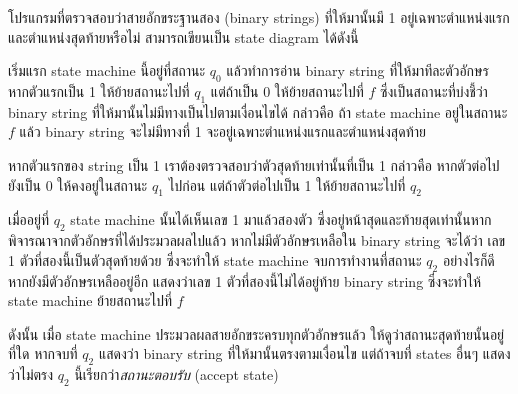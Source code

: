 \begin{example}
โปรแกรมที่ตรวจสอบว่าสายอักขระฐานสอง (binary strings) ที่ให้มานั้นมี 1 อยู่เฉพาะตำแหน่งแรกและตำแหน่งสุดท้ายหรือไม่ สามารถเขียนเป็น state diagram ได้ดังนี้
\begin{center}
\end{center}
เริ่มแรก state machine นี้อยู่ที่สถานะ $q_0$ แล้วทำการอ่าน binary string ที่ให้มาทีละตัวอักษร หากตัวแรกเป็น 1 ให้ย้ายสถานะไปที่ $q_1$ แต่ถ้าเป็น 0 ให้ย้ายสถานะไปที่ $f$ ซึ่งเป็นสถานะที่บ่งชี้ว่า binary string ที่ให้มานั้นไม่มีทางเป็นไปตามเงื่อนไขได้ กล่าวคือ ถ้า state machine อยู่ในสถานะ $f$ แล้ว binary string จะไม่มีทางที่ 1 จะอยู่เฉพาะตำแหน่งแรกและตำแหน่งสุดท้าย

หากตัวแรกของ string เป็น 1 เราต้องตรวจสอบว่าตัวสุดท้ายเท่านั้นที่เป็น 1 กล่าวคือ หากตัวต่อไปยังเป็น 0 ให้คงอยู่ในสถานะ $q_1$ ไปก่อน แต่ถ้าตัวต่อไปเป็น 1 ให้ย้ายสถานะไปที่ $q_2$

เมื่ออยู่ที่ $q_2$ state machine นั้นได้เห็นเลข 1 มาแล้วสองตัว ซึ่งอยู่หน้าสุดและท้ายสุดเท่านั้นหากพิจารณาจากตัวอักษรที่ได้ประมวลผลไปแล้ว \enskip หากไม่มีตัวอักษรเหลือใน binary string จะได้ว่า เลข 1 ตัวที่สองนี้เป็นตัวสุดท้ายด้วย ซึ่งจะทำให้ state machine จบการทำงานที่สถานะ $q_2$ อย่างไรก็ดี หากยังมีตัวอักษรเหลืออยู่อีก แสดงว่าเลข 1 ตัวที่สองนี้ไม่ได้อยู่ท้าย binary string ซึ่งจะทำให้ state machine ย้ายสถานะไปที่ $f$

ดังนั้น เมื่อ state machine ประมวลผลสายอักขระครบทุกตัวอักษรแล้ว ให้ดูว่าสถานะสุดท้ายนั้นอยู่ที่ใด หากจบที่ $q_2$ แสดงว่า binary string ที่ให้มานั้นตรงตามเงื่อนไข แต่ถ้าจบที่ states อื่นๆ แสดงว่าไม่ตรง \enskip $q_2$ นี้เรียกว่า\emph{สถานะตอบรับ} (accept state)


\end{example}
